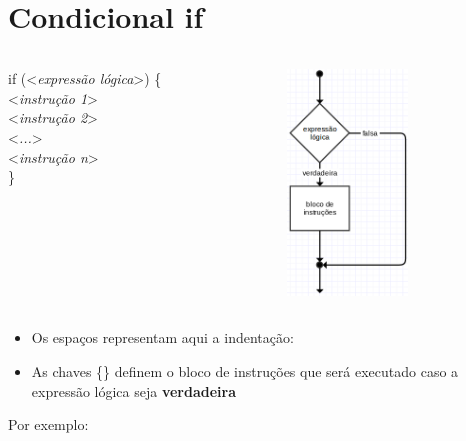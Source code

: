 \documentclass[portuguese,10pt,xcolor=table]{bredelebeamer}
\def\exp[#1]{\color{gray}<\textit{#1}>\color{black}}
\def\espaco{\color{gray}\hspace{0.2cm}\color{black}}
\begin{document}
	\section{Condicional if}
	\begin{frame}[c]
		\begin{center}
		\end{center}
	\end{frame} 
	\begin{frame} 

				\begin{columns}[t]
					\begin{column}[T]{.4\textwidth}
						if (\exp[expressão lógica]) \{\\
						\espaco \exp[instrução 1]\\
						\espaco \exp[instrução 2]\\
						\espaco \exp[...]\\
						\espaco \exp[instrução n]\\
						\}
					\end{column}
							\begin{column}[T]{.4\textwidth}
								\includegraphics[height=6.0cm]{imagens/condicional_if.png}
							\end{column}
				\end{columns}

		\begin{itemize}
			\item Os espaços \espaco representam aqui a indentação:
			\item As chaves \{\} definem o bloco de instruções que será executado caso a expressão lógica seja \textbf{verdadeira}
		\end{itemize}
	\end{frame}
	
	\begin{frame} 
	Por exemplo:
			
	\end{frame}
\end{document}
